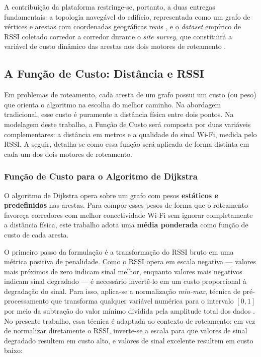 \documentclass[
    12pt,                %
    openright,           %
    oneside,             %
    a4paper,             %
    english,             %
    brazil               %
]{abntex2}
\begin{document}
A contribuição da plataforma restringe-se, portanto, a duas entregas fundamentais:
a topologia navegável do edifício, representada como um grafo de vértices e arestas
com coordenadas geográficas reais \cite{Stancel2021}, e o \textit{dataset} empírico 
de RSSI coletado corredor a corredor durante o \textit{site survey}, que constituirá 
a variável de custo dinâmico das arestas nos dois motores de roteamento 
\cite{IndoorAtlas2025}.

\subsection{A Função de Custo: Distância e RSSI}

Em problemas de roteamento, cada aresta de um grafo possui um custo (ou peso) que
orienta o algoritmo na escolha do melhor caminho. Na abordagem tradicional, esse custo
é puramente a distância física entre dois pontos. Na modelagem deste trabalho, a Função
de Custo será composta por duas variáveis complementares: a distância em metros e a
qualidade do sinal Wi-Fi, medida pelo RSSI.
A seguir, detalha-se como essa função será aplicada de forma distinta em cada um dos
dois motores de roteamento.

\subsubsection*{Função de Custo para o Algoritmo de Dijkstra}

O algoritmo de Dijkstra opera sobre um grafo com pesos \textbf{estáticos e predefinidos}
nas arestas. Para compor esses pesos de forma que o roteamento favoreça corredores com
melhor conectividade Wi-Fi sem ignorar completamente a distância física, este trabalho
adota uma \textbf{média ponderada} como função de custo de cada aresta.

O primeiro passo da formulação é a transformação do RSSI bruto em uma métrica
positiva de penalidade. Como o RSSI opera em escala negativa --- valores mais
próximos de zero indicam sinal melhor, enquanto valores mais negativos indicam
sinal degradado \cite{Chia2025} --- é necessário invertê-lo em um custo
proporcional à degradação do sinal. Para isso, aplica-se a normalização
\textit{min-max}, técnica de pré-processamento que transforma qualquer variável
numérica para o intervalo $[0, 1]$ por meio da subtração do valor mínimo dividida
pela amplitude total dos dados \cite{Han2011}. No presente trabalho, essa técnica
é adaptada ao contexto de roteamento: em vez de normalizar diretamente o RSSI,
inverte-se a escala para que valores de sinal degradado resultem em custo alto,
e valores de sinal excelente resultem em custo baixo:
\end{document}
